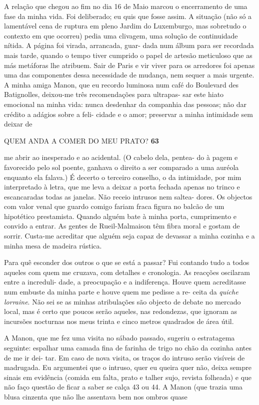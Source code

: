 A relação que chegou ao fim no dia 16 de Maio marcou o encerramento de
uma fase da minha vida. Foi deliberado; eu quis que fosse assim. A
situação (não só a lamentável cena de ruptura em pleno Jardim do
Luxemburgo, mas sobretudo o contexto em que ocorreu) pedia uma clivagem,
uma solução de continuidade nítida. A página foi virada, arrancada,
guar- dada num álbum para ser recordada mais tarde, quando o tempo tiver
cumprido o papel de artesão meticuloso que as más metáforas lhe
atribuem. Sair de Paris e vir viver para os arredores foi apenas uma das
componentes dessa necessidade de mudança, nem sequer a mais urgente. A
minha amiga Manon, que eu recordo luminosa num café do Boulevard des
Batignolles, deixou-me três recomendações para ultrapas- sar este hiato
emocional na minha vida: nunca desdenhar da companhia das pessoas; não
dar crédito a adágios sobre a feli- cidade e o amor; preservar a minha
intimidade sem deixar de

QUEM ANDA A COMER DO MEU PRATO? \textbf{63}

me abrir ao inesperado e ao acidental. (O cabelo dela, pentea- do à
pagem e favorecido pelo sol poente, ganhava o direito a ser comparado a
uma auréola enquanto ela falava.) É decerto o terceiro conselho, o da
intimidade, por mim interpretado à letra, que me leva a deixar a porta
fechada apenas no trinco e escancaradas todas as janelas. Não receio
intrusos nem saltea- dores. Os objectos com valor venal que guardo
comigo fariam fraca figura no balcão de um hipotético prestamista.
Quando alguém bate à minha porta, cumprimento e convido a entrar. As
gentes de Rueil-Malmaison têm fibra moral e gostam de sorrir. Custa-me
acreditar que alguém seja capaz de devassar a minha cozinha e a minha
mesa de madeira rústica.

Para quê esconder dos outros o que se está a passar? Fui contando tudo a
todos aqueles com quem me cruzava, com detalhes e cronologia. As
reacções oscilaram entre a increduli- dade, a preocupação e a
indiferença. Houve quem acreditasse num embuste da minha parte e houve
quem me pedisse a re- ceita da \emph{quiche lorraine}. Não sei se as
minhas atribulações são objecto de debate no mercado local, mas é certo
que poucos serão aqueles, nas redondezas, que ignoram as incursões
nocturnas nos meus trinta e cinco metros quadrados de área útil.

A Manon, que me fez uma visita no sábado passado, sugeriu o estratagema
seguinte: espalhar uma camada fina de farinha de trigo no chão da
cozinha antes de me ir dei- tar. Em caso de nova visita, os traços do
intruso serão visíveis de madrugada. Eu argumentei que o intruso, quer
eu queira quer não, deixa sempre sinais em evidência (comida em falta,
prato e talher sujo, revista folheada) e que não faço questão de ficar a
saber se calça 43 ou 44. A Manon (que trazia uma blusa cinzenta que não
lhe assentava bem nos ombros quase

